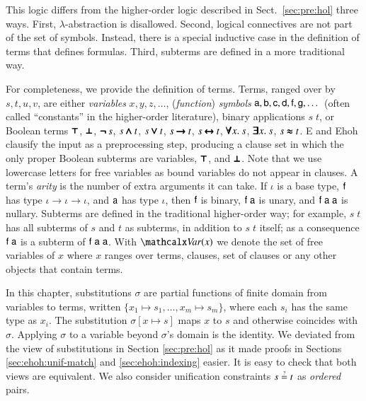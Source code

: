 This logic differs from the higher-order logic described in
Sect.~\ref{sec:pre:hol} three ways. First, $\lambda$-abstraction is disallowed.
Second, logical connectives are not part of the set of symbols. Instead, there
is a special inductive case in the definition of terms that defines formulas.
Third, subterms are defined in a more traditional way. 

For completeness, we provide the definition of terms. Terms, ranged over by $s,t,u,v$, are either
\emph{variables} $x, y, z, \dots$, (\emph{function}) \emph{symbols} $\mathsf{a},
\mathsf{b}, \mathsf{c}, \mathsf{d},\allowbreak \mathsf{f},\allowbreak \mathsf{g}, \ldots{}$
(often called ``constants'' in the higher-order literature), binary applications
$s \; t$, or Boolean terms $\pmb\top$, $\pmb\bot$, $\pmb{\neg\,} s$, $s \mathbin{\pmb\land}
t$, $s \mathbin{\pmb\lor} t$, $s \mathbin{\pmb\rightarrow} t$, $s \mathbin{\pmb\leftrightarrow} t$,
$\pmb\forall x.\> s$, $\pmb\exists x.\> s$, $s \mathrel{\pmb\approx} t$. E and Ehoh clausify
the input as a preprocessing step, producing a clause set in which the only
proper Boolean subterms are variables, $\pmb\top$, and $\pmb\bot$. Note that we use
lowercase letters for free variables as bound variables do not appear in
clauses. A term's \emph{arity} is the number of extra arguments it can take. If
$\iota$ is a base type, $\mathsf{f}$ has type $\iota \to \iota \to \iota$, and
$\mathsf{a}$ has type $\iota$, then $\mathsf{f}$ is binary, $\mathsf{f}\;\mathsf{a}$ is
unary, and $\mathsf{f}\;\mathsf{a}\;\mathsf{a}$ is nullary. Subterms are defined in the
traditional higher-order way; for example, $s \; t$ has all subterms of $s$ and
$t$ as subterms, in addition to $s \; t$ itself; as a consequence
$\mathsf{f} \; \mathsf{a}$ is a subterm of $\mathsf{f} \; \mathsf{a} \;\mathsf{a}$. With $\Var(x)$
we denote the set of free variables of $x$ where $x$ ranges over terms, clauses,
set of clauses or any other objects that contain terms.


In this chapter, substitutions $\sigma$ are partial
functions of finite domain from variables to terms, written $\{ x_1 \mapsto s_1,
\ldots, x_m \mapsto s_m \}$, where each $s_i$ has the same type as $x_i$. The
substitution $\sigma[x \mapsto s]$ maps $x$ to $s$ and otherwise coincides with
$\sigma$. Applying $\sigma$ to a variable beyond $\sigma$'s domain is the
identity. We deviated from the view of substitutions in Section \ref{sec:pre:hol}
as it made proofs in Sections \ref{sec:ehoh:unif-match} and \ref{sec:ehoh:indexing}
easier. It is easy to check that both views are equivalent. We also consider unification 
constraints $s \unif t$ as \emph{ordered} pairs.

